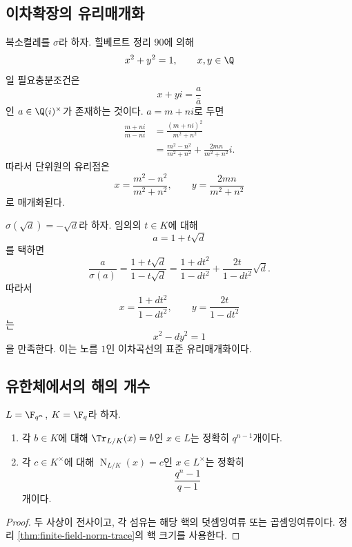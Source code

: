 \subsection{이차확장의 유리매개화}

\begin{example}[$\Q(i)/\Q$의 노름 $1$]
복소켤레를 $\sigma$라 하자. 힐베르트 정리 90에 의해
\[
  x^2+y^2=1,
  \qquad x,y\in\Q
\]
일 필요충분조건은
\[
  x+yi=\frac{a}{\overline a}
\]
인 $a\in\Q(i)^\times$가 존재하는 것이다. $a=m+ni$로 두면
\[
\begin{aligned}
  \frac{m+ni}{m-ni}
  &=\frac{(m+ni)^2}{m^2+n^2}\\
  &=\frac{m^2-n^2}{m^2+n^2}
    +\frac{2mn}{m^2+n^2}i.
\end{aligned}
\]
따라서 단위원의 유리점은
\[
  x=\frac{m^2-n^2}{m^2+n^2},
  \qquad
  y=\frac{2mn}{m^2+n^2}
\]
로 매개화된다.
\end{example}

\begin{example}[$K(\sqrt d)/K$의 노름 $1$]
$\sigma(\sqrt d)=-\sqrt d$라 하자. 임의의 $t\in K$에 대해
\[
  a=1+t\sqrt d
\]
를 택하면
\[
  \frac{a}{\sigma(a)}
  =\frac{1+t\sqrt d}{1-t\sqrt d}
  =\frac{1+dt^2}{1-dt^2}
   +\frac{2t}{1-dt^2}\sqrt d.
\]
따라서
\[
  x=\frac{1+dt^2}{1-dt^2},
  \qquad
  y=\frac{2t}{1-dt^2}
\]
는
\[
  x^2-dy^2=1
\]
을 만족한다. 이는 노름 $1$인 이차곡선의 표준 유리매개화이다.
\end{example}

\subsection{유한체에서의 해의 개수}

\begin{corollary}
$L=\F_{q^n}$, $K=\F_q$라 하자.
\begin{enumerate}[label=(\roman*)]
  \item 각 $b\in K$에 대해 $\Tr_{L/K}(x)=b$인 $x\in L$는 정확히 $q^{n-1}$개이다.
  \item 각 $c\in K^\times$에 대해 $\operatorname N_{L/K}(x)=c$인 $x\in L^\times$는 정확히
  \[
    \frac{q^n-1}{q-1}
  \]
  개이다.
\end{enumerate}
\end{corollary}

\begin{proof}
두 사상이 전사이고, 각 섬유는 해당 핵의 덧셈잉여류 또는 곱셈잉여류이다. 정리 \ref{thm:finite-field-norm-trace}의 핵 크기를 사용한다.
\end{proof}

